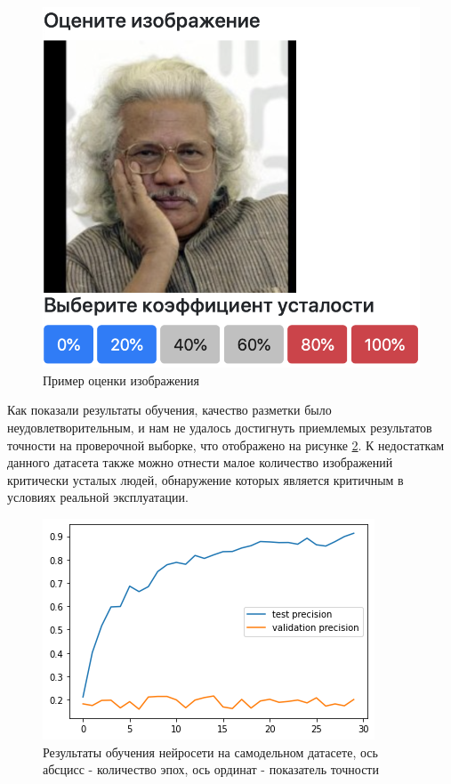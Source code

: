 \documentclass[12pt, letterpaper]{article}
\begin{document}
    \begin{figure}[H]
        \centering
        \includegraphics[width=1\linewidth]{test_man.png}
        \caption{Пример оценки изображения}
        \label{fig:test_man}
    \end{figure}

    Как показали результаты обучения, качество разметки было неудовлетворительным, и нам не удалось достигнуть приемлемых результатов точности на проверочной выборке, что отображено на рисунке \ref{fig:old_dataset_result}. К недостаткам данного датасета также можно отнести малое количество изображений критически усталых людей, обнаружение которых является критичным в условиях реальной эксплуатации.
    
    \begin{figure}[H]
        \centering
        \includegraphics[width=1\linewidth]{old_dataset_results.png}
        \caption{Результаты обучения нейросети на самодельном датасете, ось абсцисс - количество эпох, ось ординат - показатель точности}
        \label{fig:old_dataset_result}
    \end{figure}
    
\end{document}

